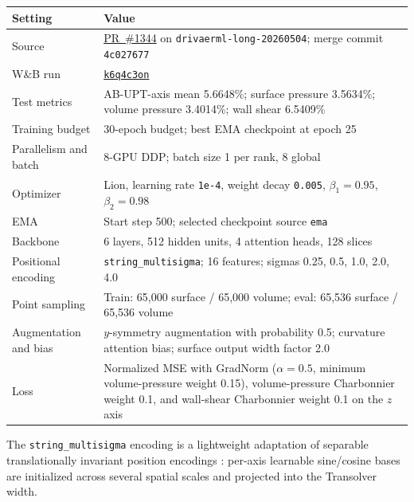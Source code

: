 \documentclass{article}
\begin{document}
\begin{center}
  \label{tab:app-drivaerml-config}
  \small
  \begin{tabular}{@{}p{}p{}@{}}
    \toprule
    Setting & Value \\
    \midrule
    Source & \href{https://github.com/morganmcg1/DrivAerML/pull/1344}{PR~\#1344} on \texttt{drivaerml-long-20260504}; merge commit \texttt{4c027677} \\
    W\&B run & \href{https://wandb.ai/wandb-applied-ai-team/senpai-v1-drivaerml-ddp8/runs/k6q4c3on}{\texttt{k6q4c3on}} \\
    Test metrics & AB-UPT-axis mean 5.6648\%; surface pressure 3.5634\%; volume pressure 3.4014\%; wall shear 6.5409\% \\
    Training budget & 30-epoch budget; best EMA checkpoint at epoch 25 \\
    Parallelism and batch & 8-GPU DDP; batch size 1 per rank, 8 global \\
    Optimizer & Lion, learning rate \texttt{1e-4}, weight decay \texttt{0.005}, $\beta_1=0.95$, $\beta_2=0.98$ \\
    EMA & Start step 500; selected checkpoint source \texttt{ema} \\
    Backbone & 6 layers, 512 hidden units, 4 attention heads, 128 slices \\
    Positional encoding & \texttt{string\_multisigma}; 16 features; sigmas 0.25, 0.5, 1.0, 2.0, 4.0 \\
    Point sampling & Train: 65,000 surface / 65,000 volume; eval: 65,536 surface / 65,536 volume \\
    Augmentation and bias & $y$-symmetry augmentation with probability 0.5; curvature attention bias; surface output width factor 2.0 \\
    Loss & Normalized MSE with GradNorm ($\alpha=0.5$, minimum volume-pressure weight 0.15), volume-pressure Charbonnier weight 0.1, and wall-shear Charbonnier weight 0.1 on the $z$ axis \\
    \bottomrule
  \end{tabular}
\end{center}

The \texttt{string\_multisigma} encoding is a lightweight adaptation of separable translationally invariant position encodings \citep{schenck2025learningropes}: per-axis learnable sine/cosine bases are initialized across several spatial scales and projected into the Transolver width.
\end{document}
